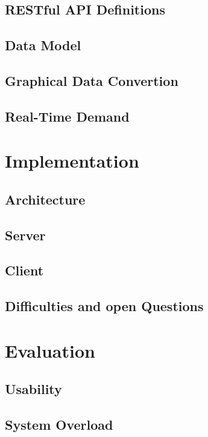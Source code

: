 \documentclass[english, BCOR=6mm, twoside=true, open=right]{tudscrreprt}
\begin{document}
\section{RESTful API Definitions}
\section{Data Model}
\section{Graphical Data Convertion}
\section{Real-Time Demand}

\chapter{Implementation}
\section{Architecture}
\section{Server}
\section{Client}
\section{Difficulties and open Questions}


\chapter{Evaluation}
\section{Usability}
\section{System Overload}
\end{document}
